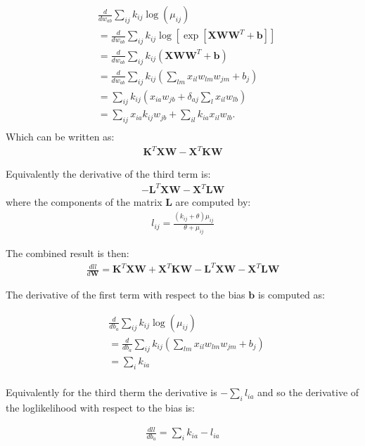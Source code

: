 \documentclass[11pt]{letter}
\newcommand{\matr}[1]{\mathbf{#1}}
\begin{document}
\begin{align*}
&\frac{d}{dw_{ab}}\sum_{ij} k_{ij} \log{(\mu_{ij})} \\
&= \frac{d}{dw_{ab}}\sum_{ij} k_{ij} \log{[\exp{[\matr{X} \matr{W} \matr{W}^T + \matr{b}]}]} \\
&= \frac{d}{dw_{ab}}\sum_{ij} k_{ij} \left (\matr{X} \matr{W} \matr{W}^T + \matr{b} \right ) \\
&= \frac{d}{dw_{ab}}\sum_{ij} k_{ij} \left (\sum_{lm} x_{il} w_{lm} w_{jm} + b_j \right ) \\
&= \sum_{ij} k_{ij} \left (x_{ia} w_{jb} + \delta_{aj} \sum_{l} x_{il}w_{lb} \right ) \\
&= \sum_{ij} x_{ia} k_{ij} w_{jb} + \sum_{il} k_{ia} x_{il} w_{lb}. \\
\end{align*}
Which can be written as:
\begin{align*}
\matr{K}^T \matr{X} \matr{W} - \matr{X}^T \matr{K} \matr{W}
\end{align*}

Equivalently the derivative of the third term is:
\begin{align*}
-\matr{L}^T \matr{X} \matr{W} - \matr{X}^T \matr{L} \matr{W}
\end{align*}
where the components of the matrix $\matr{L}$ are computed by:
\begin{align*}
l_{ij} = \frac{(k_{ij} + \theta) \mu_{ij}}{\theta + \mu_{ij}}   
\end{align*}

The combined result is then:
\begin{align*}
\frac{dll}{d\matr{W}} = \matr{K}^T \matr{X} \matr{W} + \matr{X}^T \matr{K} \matr{W} - 
\matr{L}^T \matr{X} \matr{W} - \matr{X}^T \matr{L} \matr{W}
\end{align*}


The derivative of the first term with respect to the bias $\matr{b}$ is computed as:

\begin{align*}
&\frac{d}{db_{a}}\sum_{ij} k_{ij} \log{(\mu_{ij})} \\
&= \frac{d}{db_{a}}\sum_{ij} k_{ij} \left (\sum_{lm} x_{il} w_{lm} w_{jm} + b_j \right) \\
&= \sum_{i} k_{ia}\\
\end{align*}

Equivalently for the third therm the derivative is $-\sum_{i} l_{ia}$ and so the derivative of the loglikelihood with respect to the bias is:

\begin{align*}
\frac{dll}{db_a} = \sum_{i} k_{ia} - l_{ia}\\
\end{align*}
\end{document}
